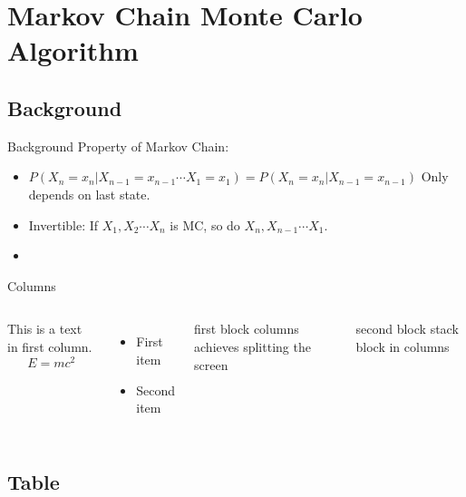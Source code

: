 \section[MCMC]{Markov Chain Monte Carlo Algorithm}
\subsection{Background}

\begin{frame}{Background}
    Property of Markov Chain:
    \begin{itemize}
        \item \(P(X_n = x_n |X_{n-1} = x_{n-1}\cdots X_{1} = x_1) = P(X_n = x_n |X_{n-1} = x_{n-1})\) Only depends on last state.
        \item Invertible: If \(X_1,X_2\cdots X_n\) is MC, so do \(X_n,X_{n-1}\cdots X_1\).
        \item 
    \end{itemize}
\end{frame}

\begin{frame}{Columns}
    \begin{columns}
        This is a text in first column.
        $$E=mc^2$$
        \begin{itemize}
        \item First item
        \item Second item
        \end{itemize}
        
        \begin{block}{first block}
            columns achieves splitting the screen
        \end{block}
        \begin{block}{second block}
            stack block in columns
        \end{block}
        
    \end{columns}
\end{frame}

\subsection{Table}

